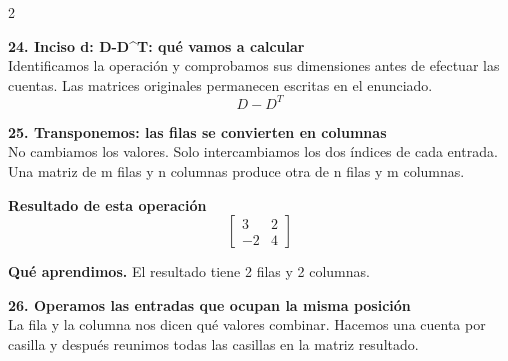 \documentclass[11pt,a4paper,landscape]{article}
\begin{document}
\begin{multicols*}{2}
\begin{minipage}{\linewidth}
\end{minipage}\par\medskip
\noindent\begin{minipage}{\linewidth}\textbf{24. Inciso d: D-D\textasciicircum{}T: qué vamos a calcular}\\[2pt]Identificamos la operación y comprobamos sus dimensiones antes de efectuar las cuentas. Las matrices originales permanecen escritas en el enunciado.
\[D-D^T\]
\end{minipage}\par\medskip
\noindent\begin{minipage}{\linewidth}\textbf{25. Transponemos: las filas se convierten en columnas}\\[2pt]No cambiamos los valores. Solo intercambiamos los dos índices de cada entrada. Una matriz de m filas y n columnas produce otra de n filas y m columnas.
\par{}\par\smallskip
\par\smallskip \textbf{Resultado de esta operación}\[\begin{bmatrix}3 & 2\\-2 & 4\end{bmatrix}\]
\par\smallskip\textbf{Qué aprendimos.} El resultado tiene 2 filas y 2 columnas.
\end{minipage}\par\medskip
\noindent\begin{minipage}{\linewidth}\textbf{26. Operamos las entradas que ocupan la misma posición}\\[2pt]La fila y la columna nos dicen qué valores combinar. Hacemos una cuenta por casilla y después reunimos todas las casillas en la matriz resultado.

\end{minipage}
\end{multicols*}
\end{document}
